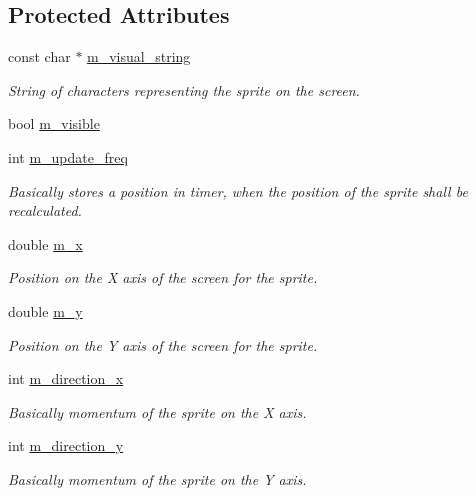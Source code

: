 \subsection*{Protected Attributes}
\begin{DoxyCompactItemize}
\item 
const char $\ast$ \hyperlink{classSprite_adf82741e0c96c05cdd1c96ceda8df837}{m\+\_\+visual\+\_\+string}
\begin{DoxyCompactList}\small\item\em String of characters representing the sprite on the screen. \end{DoxyCompactList}\item 
bool \hyperlink{classSprite_ad0254af9247c4e1d5d220bb89b3ef745}{m\+\_\+visible}
\item 
int \hyperlink{classSprite_adf17b6ade9cc7dffc1833bc6649b6a13}{m\+\_\+update\+\_\+freq}
\begin{DoxyCompactList}\small\item\em Basically stores a position in timer, when the position of the sprite shall be recalculated. \end{DoxyCompactList}\item 
double \hyperlink{classSprite_ac0a1a6a0c8fce6f46b30152b263fd2a9}{m\+\_\+x}
\begin{DoxyCompactList}\small\item\em Position on the X axis of the screen for the sprite. \end{DoxyCompactList}\item 
double \hyperlink{classSprite_adc245ad211b04b31cd234fb080b4b034}{m\+\_\+y}
\begin{DoxyCompactList}\small\item\em Position on the Y axis of the screen for the sprite. \end{DoxyCompactList}\item 
int \hyperlink{classSprite_ada1b4009e13a72b62fc139bb5f182a12}{m\+\_\+direction\+\_\+x}
\begin{DoxyCompactList}\small\item\em Basically momentum of the sprite on the X axis. \end{DoxyCompactList}\item 
int \hyperlink{classSprite_ab55aaafbb990f7d5c6f93b513dd5ce62}{m\+\_\+direction\+\_\+y}
\begin{DoxyCompactList}\small\item\em Basically momentum of the sprite on the Y axis. \end{DoxyCompactList}\end{DoxyCompactItemize}


